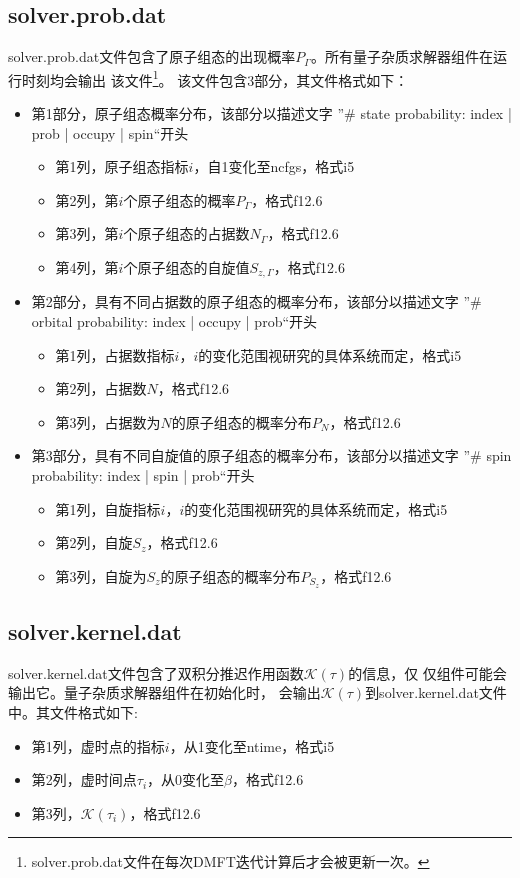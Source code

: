 \subsection{solver.prob.dat}
solver.prob.dat文件包含了原子组态的出现概率$P_{\Gamma}$。所有量子杂质求解器组件在运行时刻均会输出
该文件\footnote{solver.prob.dat文件在每次DMFT迭代计算后才会被更新一次。}。
该文件包含3部分，其文件格式如下：
\begin{itemize}
\item 第1部分，原子组态概率分布，该部分以描述文字
      ”\# state probability: index | prob | occupy | spin“开头
  \begin{itemize}
  \item 第1列，原子组态指标$i$，自1变化至ncfgs，格式i5
  \item 第2列，第$i$个原子组态的概率$P_{\Gamma}$，格式f12.6 
  \item 第3列，第$i$个原子组态的占据数$N_{\Gamma}$，格式f12.6
  \item 第4列，第$i$个原子组态的自旋值$S_{z,\Gamma}$，格式f12.6
  \end{itemize}
\item 第2部分，具有不同占据数的原子组态的概率分布，该部分以描述文字
      ”\# orbital probability: index | occupy | prob“开头
  \begin{itemize}
  \item 第1列，占据数指标$i$，$i$的变化范围视研究的具体系统而定，格式i5
  \item 第2列，占据数$N$，格式f12.6
  \item 第3列，占据数为$N$的原子组态的概率分布$P_{N}$，格式f12.6
  \end{itemize}
\item 第3部分，具有不同自旋值的原子组态的概率分布，该部分以描述文字
      ”\# spin probability: index | spin | prob“开头
  \begin{itemize}
  \item 第1列，自旋指标$i$，$i$的变化范围视研究的具体系统而定，格式i5
  \item 第2列，自旋$S_{z}$，格式f12.6
  \item 第3列，自旋为$S_{z}$的原子组态的概率分布$P_{S_{z}}$，格式f12.6
  \end{itemize}

\end{itemize}

\subsection{solver.kernel.dat}
solver.kernel.dat文件包含了双积分推迟作用函数$\mathcal{K}(\tau)$的信息，仅
仅{\narcissus}组件可能会输出它。{\narcissus}量子杂质求解器组件在初始化时，
会输出$\mathcal{K}(\tau)$到solver.kernel.dat文件中。其文件格式如下:
\begin{itemize}
\item 第1列，虚时点的指标$i$，从1变化至ntime，格式i5
\item 第2列，虚时间点$\tau_{i}$，从0变化至$\beta$，格式f12.6
\item 第3列，$\mathcal{K}(\tau_{i})$，格式f12.6
\end{itemize}

